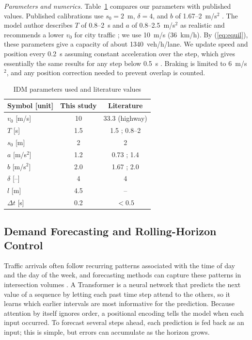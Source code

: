 \documentclass[letterpaper,12pt,conference]{ieeeconf}
\begin{document}
\emph{Parameters and numerics.} Table~\ref{tab:idm} compares our
parameters with published values. Published calibrations use
$s_0=2$~m, $\delta=4$, and $b$ of 1.67--2~m/s$^2$
\cite{treiber2000,kesting2010}. The model author describes $T$ of
0.8--2~s and $a$ of 0.8--2.5~m/s$^2$ as realistic and recommends a
lower $v_0$ for city traffic \cite{treiberweb}; we use 10~m/s
(36~km/h). By (\ref{eq:equil}), these parameters give a capacity
of about 1340~veh/h/lane. We update speed and position every 0.2~s
assuming constant acceleration over the step, which gives
essentially the same results for any step below 0.5~s
\cite{treiberweb}. Braking is limited to 6~m/s$^2$, and any
position correction needed to prevent overlap is counted.

\begin{table}[t]
\caption{IDM parameters used and literature values}
\label{tab:idm}
\centering
\footnotesize
\setlength{\tabcolsep}{4pt}
\begin{tabular}{lcc}
\toprule
Symbol [unit] & This study & Literature \\
\midrule
$v_0$ [m/s] & 10 & 33.3 (highway) \cite{treiber2000,kesting2010} \\
$T$ [s] & 1.5 & 1.5 \cite{kesting2010}; 0.8--2 \cite{treiberweb} \\
$s_0$ [m] & 2 & 2 \cite{treiber2000,kesting2010} \\
$a$ [m/s$^2$] & 1.2 & 0.73 \cite{treiber2000}; 1.4 \cite{kesting2010} \\
$b$ [m/s$^2$] & 2.0 & 1.67 \cite{treiber2000}; 2.0 \cite{kesting2010} \\
$\delta$ [--] & 4 & 4 \cite{treiber2000} \\
$l$ [m] & 4.5 & -- \\
$\Delta t$ [s] & 0.2 & $<0.5$ \cite{treiberweb} \\
\bottomrule
\end{tabular}
\end{table}

\subsection{Demand Forecasting and Rolling-Horizon Control}

Traffic arrivals often follow recurring patterns associated with
the time of day and the day of the week, and forecasting methods
can capture these patterns in intersection volumes
\cite{elkhouly2025}. A Transformer \cite{vaswani2017} is a neural
network that predicts the next value of a sequence by letting each
past time step attend to the others, so it learns which earlier
intervals are most informative for the prediction. Because
attention by itself ignores order, a positional encoding tells the
model when each input occurred. To forecast several steps ahead,
each prediction is fed back as an input; this is simple, but
errors can accumulate as the horizon grows.
\end{document}
